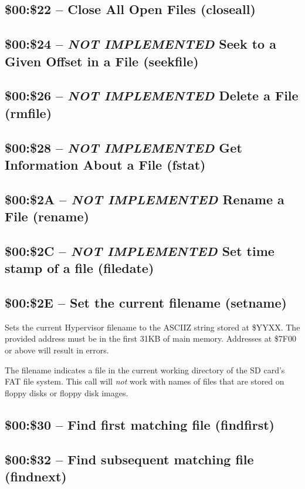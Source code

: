 \subsection{\$00:\$22 -- Close All Open Files (closeall)}
\subsection{\$00:\$24 -- {\em NOT IMPLEMENTED} Seek to a Given Offset in a File (seekfile)}
\subsection{\$00:\$26 -- {\em NOT IMPLEMENTED} Delete a File (rmfile)}
\subsection{\$00:\$28 -- {\em NOT IMPLEMENTED} Get Information About a File (fstat)}
\subsection{\$00:\$2A -- {\em NOT IMPLEMENTED} Rename a File (rename)}
\subsection{\$00:\$2C -- {\em NOT IMPLEMENTED} Set time stamp of a file (filedate)}
\subsection{\$00:\$2E -- Set the current filename (setname)}

Sets the current Hypervisor filename to the ASCIIZ string stored at \$YYXX. The provided address
must be in the first 31KB of main memory.  Addresses at \$7F00 or above will result in errors.

The filename indicates a file in the current working directory of the SD card's FAT file system.
This call will {\em not} work with names of files that are stored on floppy disks or floppy disk
images.  

\subsection{\$00:\$30 -- Find first matching file (findfirst)}
\subsection{\$00:\$32 -- Find subsequent matching file (findnext)}
